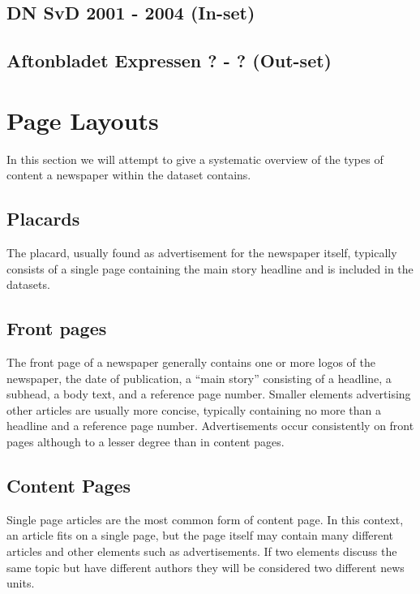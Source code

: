 \documentclass[english, bibtex]{kththesis}
\begin{document}
\subsection{DN SvD 2001 - 2004 (In-set)}

\subsection{Aftonbladet Expressen ? - ? (Out-set)}


\section{Page Layouts}

In this section we will attempt to give a systematic overview of the types of content a newspaper within the dataset contains. 

\subsection{Placards}

The placard, usually found as advertisement for the newspaper itself, typically consists of a single page containing the main story headline and is included in the datasets. 

\subsection{Front pages}

The front page of a newspaper generally contains one or more logos of the newspaper, the date of publication, a “main story” consisting of a headline, a subhead, a body text, and a reference page number. Smaller elements advertising other articles are usually more concise, typically containing no more than a headline and a reference page number. Advertisements occur consistently on front pages although to a lesser degree than in content pages. 

\subsection{Content Pages}

Single page articles are the most common form of content page. In this context, an article fits on a single page, but the page itself may contain many different articles and other elements such as advertisements. If two elements discuss the same topic but have different authors they will be considered two different news units.
\end{document}
